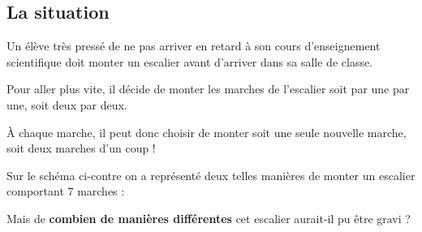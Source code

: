 \documentclass[oneside,12pt]{article}          %
\begin{document}
\begin{minipage}{0.55\textwidth} 
	\subsection{La situation} 
	
	Un élève très pressé de ne pas arriver en retard à son cours d'enseignement scientifique doit monter un escalier avant d'arriver dans sa salle de classe.
	
	\bigskip
	Pour aller plus vite, il décide de monter les marches de l'escalier soit par une par une, soit deux par deux.
	
	\bigskip
	À chaque marche, il peut donc choisir de monter soit une seule nouvelle marche, soit deux marches d'un coup !
	
	\bigskip
	Sur le schéma ci-contre on a représenté deux telles manières de monter un escalier comportant 7 marches :
	
	\bigskip
	Mais de \textbf{combien de manières différentes} cet escalier aurait-il pu être gravi ?
\end{minipage}
\hspace{5mm}
\end{document}
